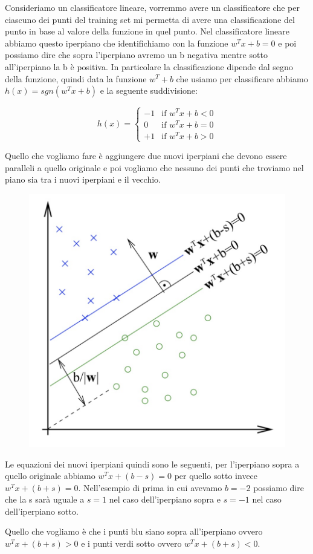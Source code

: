 \documentclass[14pt]{extreport}
\begin{document}
Consideriamo un classificatore lineare, vorremmo avere un classificatore che per ciascuno dei punti del training set mi permetta di avere una
classificazione del punto in base al valore della funzione in quel punto. Nel classificatore lineare abbiamo questo iperpiano che identifichiamo con
la funzione $w^Tx+b=0$ e poi possiamo dire che sopra l'iperpiano avremo un b negativa mentre sotto all'iperpiano la b è positiva. In particolare la
classificazione dipende dal segno della funzione, quindi data la funzione $w^T +b$ che usiamo per classificare abbiamo $h(x) = sgn(w^Tx+b)$ e la
seguente suddivisione:


\begin{equation}
 h(x)=
 \begin{cases}
  -1 & \text{if $w^Tx+b < 0$}    \\
  0 & \text{if $w^Tx+b = 0$} \\
  +1 & \text{if $w^Tx+b > 0$}
 \end{cases}
\label{eq4}
\end{equation}


Quello che vogliamo fare è aggiungere due nuovi iperpiani che devono essere paralleli a quello originale e poi vogliamo che nessuno dei punti che
troviamo nel piano sia tra i nuovi iperpiani e il vecchio.

\begin{figure}[H]
\centering
\includegraphics[width=0.5\linewidth]{314.jpeg}
\end{figure}

Le equazioni dei nuovi iperpiani quindi sono le seguenti, per l'iperpiano sopra a quello originale abbiamo $w^Tx+(b-s)=0$ per quello sotto invece
$w^Tx+(b+s)=0$. Nell'esempio di prima in cui avevamo $b=-2$ possiamo dire che la s sarà uguale a $s=1$ nel caso dell'iperpiano sopra e $s=-1$ nel caso
dell'iperpiano sotto.

Quello che vogliamo è che i punti blu siano sopra all'iperpiano ovvero $w^Tx+(b+s)>0$ e i punti verdi sotto ovvero $w^Tx+(b+s)<0$.
\end{document}
